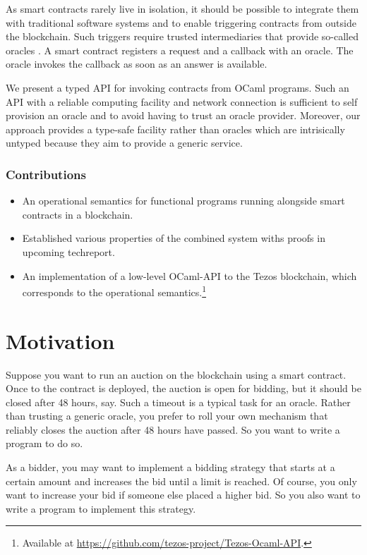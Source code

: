 \documentclass[a4paper]{llncs}
\begin{document}
As smart contracts rarely live in isolation, it should be possible to
integrate them with traditional software systems and to enable
triggering contracts from outside the blockchain. Such triggers
require trusted intermediaries that provide so-called oracles \cite{oracle-patterns,call-action-oracle}. A
smart contract registers a request and a callback with an oracle. The
oracle invokes the callback as soon as an answer is available. 

We present a typed API for invoking contracts from OCaml
programs. Such an API with a reliable computing facility and network
connection is sufficient to self provision an oracle and to avoid
having to trust an oracle provider. Moreover, our approach provides a
type-safe facility rather than oracles which are intrisically untyped
because they aim to provide a generic service.

\subsubsection{Contributions}
\label{sec:contributions}

\begin{itemize}
\item An operational semantics for functional programs running
  alongside smart contracts in a blockchain. 
\item Established various properties of the combined system withs
  proofs in upcoming techreport.
\item An implementation of a low-level OCaml-API to the Tezos
  blockchain, which corresponds to the operational semantics.\footnote{%
    Available at \url{https://github.com/tezos-project/Tezos-Ocaml-API}.}
\end{itemize}

\section{Motivation}
\label{sec:motivation}

Suppose you want to run an auction on the blockchain using a smart
contract. Once to the contract is deployed, the
auction is open for bidding, but it should be closed after 48 hours,
say. Such a timeout is a typical task for an oracle. Rather than
trusting a generic oracle, you prefer to roll your own mechanism that reliably closes the auction
after 48 hours have passed. So you want to write a program to do so. 

As a bidder, you may want to implement a bidding
strategy that starts at a certain amount and increases the bid until a
limit is reached. Of course, you only want to increase your bid if
someone else placed a higher bid. So you also want to write a
program to implement this strategy.
\end{document}
